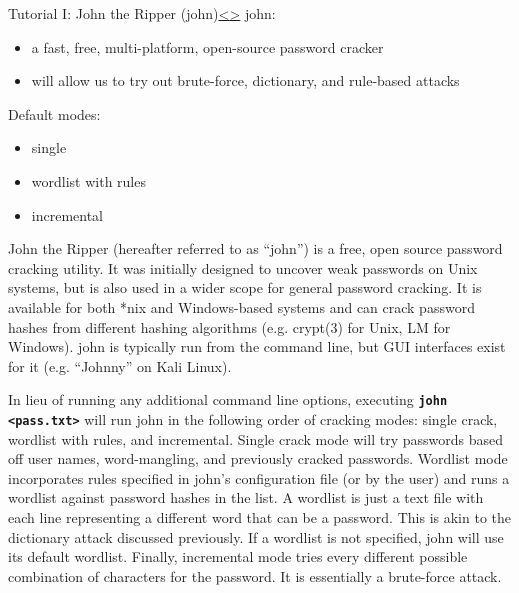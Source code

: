 \documentclass[12pt]{extarticle}
\newcommand{\code}[1]{\texttt{\bfseries#1}}
\newenvironment{instructionblock}{\Large\bgroup}{\egroup}
\newcommand{\bi}{\begin{itemize}}
\newcommand{\ei}{\end{itemize}}
\begin{document}
\pagebreak
\begin{slide}{Tutorial I: John the Ripper (john)}{\hyperref[slide 5]{\textless}\hyperref[slide 7]{\textgreater}}
	\begin{instructionblock}
		john:
		\bi 
			\item a fast, free, multi-platform, open-source password cracker
			\item will allow us to try out brute-force, dictionary, and rule-based attacks
		\ei 
		Default modes:
		\bi
			\item single
			\item wordlist with rules
			\item incremental
		\ei
	\end{instructionblock}
\end{slide}
\vfill

John the Ripper (hereafter referred to as ``john'') is a free, open source password cracking utility. It was initially designed to uncover weak passwords on Unix systems, but is also used in a wider scope for general password cracking. It is available for both *nix and Windows-based systems and can crack password hashes from different hashing algorithms (e.g. crypt(3) for Unix, LM for Windows). \cite{john} john is typically run from the command line, but GUI interfaces exist for it (e.g. ``Johnny'' on Kali Linux).

In lieu of running any additional command line options, executing \code{john \textless pass.txt\textgreater} will run john in the following order of cracking modes: single crack, wordlist with rules, and incremental. Single crack mode will try passwords based off user names, word-mangling, and previously cracked passwords. Wordlist mode incorporates rules specified in john's configuration file (or by the user) and runs a wordlist against password hashes in the list. A wordlist is just a text file with each line representing a different word that can be a password. This is akin to the dictionary attack discussed previously. If a wordlist is not specified, john will use its default wordlist. Finally, incremental mode tries every different possible combination of characters for the password. It is essentially a brute-force attack. \cite{john}
\end{document}
